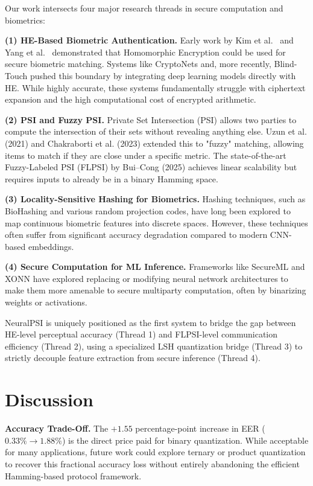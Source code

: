 \documentclass[11pt,a4paper]{article}
\begin{document}
Our work intersects four major research threads in secure computation and biometrics:

\textbf{(1) HE-Based Biometric Authentication.} Early work by Kim et al.~\cite{KimOhKim20} and Yang et al.~\cite{YangEtAl20} demonstrated that Homomorphic Encryption could be used for secure biometric matching. Systems like CryptoNets and, more recently, Blind-Touch pushed this boundary by integrating deep learning models directly with HE. While highly accurate, these systems fundamentally struggle with ciphertext expansion and the high computational cost of encrypted arithmetic.

\textbf{(2) PSI and Fuzzy PSI.} Private Set Intersection (PSI) allows two parties to compute the intersection of their sets without revealing anything else. Uzun et al. (2021) and Chakraborti et al. (2023) extended this to "fuzzy" matching, allowing items to match if they are close under a specific metric. The state-of-the-art Fuzzy-Labeled PSI (FLPSI) by Bui--Cong (2025) achieves linear scalability but requires inputs to already be in a binary Hamming space.

\textbf{(3) Locality-Sensitive Hashing for Biometrics.} Hashing techniques, such as BioHashing and various random projection codes, have long been explored to map continuous biometric features into discrete spaces. However, these techniques often suffer from significant accuracy degradation compared to modern CNN-based embeddings.

\textbf{(4) Secure Computation for ML Inference.} Frameworks like SecureML and XONN have explored replacing or modifying neural network architectures to make them more amenable to secure multiparty computation, often by binarizing weights or activations.

NeuralPSI is uniquely positioned as the first system to bridge the gap between HE-level perceptual accuracy (Thread 1) and FLPSI-level communication efficiency (Thread 2), using a specialized LSH quantization bridge (Thread 3) to strictly decouple feature extraction from secure inference (Thread 4).

\section{Discussion}

\textbf{Accuracy Trade-Off.} The $+1.55$ percentage-point increase in EER ($0.33\%\to1.88\%$) is the direct price paid for binary quantization. While acceptable for many applications, future work could explore ternary or product quantization to recover this fractional accuracy loss without entirely abandoning the efficient Hamming-based protocol framework.
\end{document}

